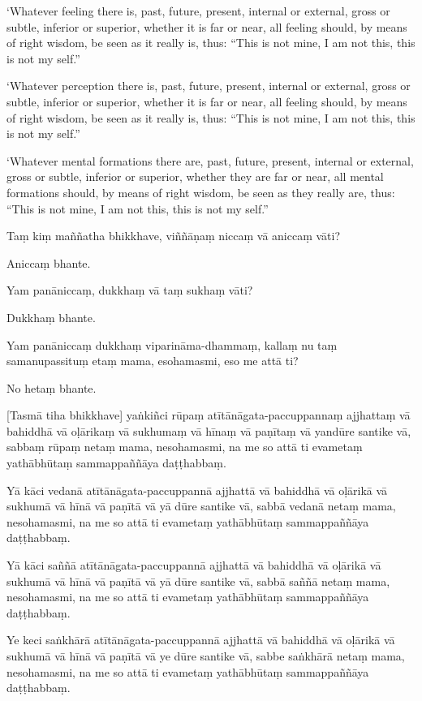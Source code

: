 ‘Whatever feeling there is, past, future, present, internal or
external, gross or subtle, inferior or superior, whether it is far or
near, all feeling should, by means of right wisdom, be seen as it really
is, thus: “This is not mine, I am not this, this is not my self.”

‘Whatever perception there is, past, future, present, internal or
external, gross or subtle, inferior or superior, whether it is far or
near, all feeling should, by means of right wisdom, be seen as it really
is, thus: “This is not mine, I am not this, this is not my self.”

‘Whatever mental formations there are, past, future, present, internal
or external, gross or subtle, inferior or superior, whether they are far
or near, all mental formations should, by means of right wisdom, be seen
as they really are, thus: “This is not mine, I am not this, this is not
my self.”

\clearpage

\paliText
\markboth{\paliTitle}{\rightmark}

Taṃ kiṃ maññatha bhikkhave, viññāṇaṃ niccaṃ vā aniccaṃ vāti?

Aniccaṃ bhante.

Yam panāniccaṃ, dukkhaṃ vā taṃ sukhaṃ vāti?

Dukkhaṃ bhante.

Yam panāniccaṃ dukkhaṃ viparināma-dhammaṃ, kallaṃ nu taṃ samanupassituṃ
etaṃ mama, esohamasmi, eso me attā ti?

No hetaṃ bhante.

[Tasmā tiha bhikkhave] yaṅkiñci rūpaṃ atītānāgata-paccuppannaṃ ajjhattaṃ
vā bahiddhā vā oḷārikaṃ vā sukhumaṃ vā hīnaṃ vā paṇītaṃ vā yandūre
santike vā, sabbaṃ rūpaṃ netaṃ mama, nesohamasmi, na me so attā ti
evametaṃ yathābhūtaṃ sammappaññāya daṭṭhabbaṃ.

Yā kāci vedanā atītānāgata-paccuppannā ajjhattā vā bahiddhā vā oḷārikā
vā sukhumā vā hīnā vā paṇītā vā yā dūre santike vā, sabbā vedanā netaṃ
mama, nesohamasmi, na me so attā ti evametaṃ yathābhūtaṃ sammappaññāya
daṭṭhabbaṃ.

Yā kāci saññā atītānāgata-paccuppannā ajjhattā vā bahiddhā vā oḷārikā vā
sukhumā vā hīnā vā paṇītā vā yā dūre santike vā, sabbā saññā netaṃ mama,
nesohamasmi, na me so attā ti evametaṃ yathābhūtaṃ sammappaññāya
daṭṭhabbaṃ.

Ye keci saṅkhārā atītānāgata-paccuppannā ajjhattā vā bahiddhā vā oḷārikā
vā sukhumā vā hīnā vā paṇītā vā ye dūre santike vā, sabbe saṅkhārā netaṃ
mama, nesohamasmi, na me so attā ti evametaṃ yathābhūtaṃ sammappaññāya
daṭṭhabbaṃ.


